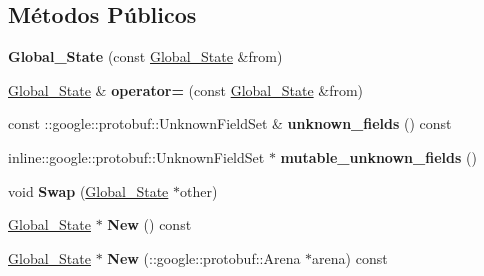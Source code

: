 \subsection*{Métodos Públicos}
\begin{DoxyCompactItemize}
\item 
{\bfseries Global\+\_\+\+State} (const \hyperlink{classvss__state_1_1Global__State}{Global\+\_\+\+State} \&from)\hypertarget{classvss__state_1_1Global__State_a3a0a70c553656e9c3049308a9513e60c}{}\label{classvss__state_1_1Global__State_a3a0a70c553656e9c3049308a9513e60c}

\item 
\hyperlink{classvss__state_1_1Global__State}{Global\+\_\+\+State} \& {\bfseries operator=} (const \hyperlink{classvss__state_1_1Global__State}{Global\+\_\+\+State} \&from)\hypertarget{classvss__state_1_1Global__State_a01f51f37ae680992a1fd7b0aa3170af9}{}\label{classvss__state_1_1Global__State_a01f51f37ae680992a1fd7b0aa3170af9}

\item 
const \+::google\+::protobuf\+::\+Unknown\+Field\+Set \& {\bfseries unknown\+\_\+fields} () const \hypertarget{classvss__state_1_1Global__State_ad315f5c8ac8db0801d1f554b0f5220e9}{}\label{classvss__state_1_1Global__State_ad315f5c8ac8db0801d1f554b0f5220e9}

\item 
inline\+::google\+::protobuf\+::\+Unknown\+Field\+Set $\ast$ {\bfseries mutable\+\_\+unknown\+\_\+fields} ()\hypertarget{classvss__state_1_1Global__State_a4dbf780222435e650455d532b81dca44}{}\label{classvss__state_1_1Global__State_a4dbf780222435e650455d532b81dca44}

\item 
void {\bfseries Swap} (\hyperlink{classvss__state_1_1Global__State}{Global\+\_\+\+State} $\ast$other)\hypertarget{classvss__state_1_1Global__State_a2b83b57b8673e15692526e3c4ccccc94}{}\label{classvss__state_1_1Global__State_a2b83b57b8673e15692526e3c4ccccc94}

\item 
\hyperlink{classvss__state_1_1Global__State}{Global\+\_\+\+State} $\ast$ {\bfseries New} () const \hypertarget{classvss__state_1_1Global__State_a2e84bb1599128b996a43de926501d5bc}{}\label{classvss__state_1_1Global__State_a2e84bb1599128b996a43de926501d5bc}

\item 
\hyperlink{classvss__state_1_1Global__State}{Global\+\_\+\+State} $\ast$ {\bfseries New} (\+::google\+::protobuf\+::\+Arena $\ast$arena) const \hypertarget{classvss__state_1_1Global__State_a9d41a76067944912f31e2c4952fa17dd}{}\label{classvss__state_1_1Global__State_a9d41a76067944912f31e2c4952fa17dd}


\end{DoxyCompactItemize}
